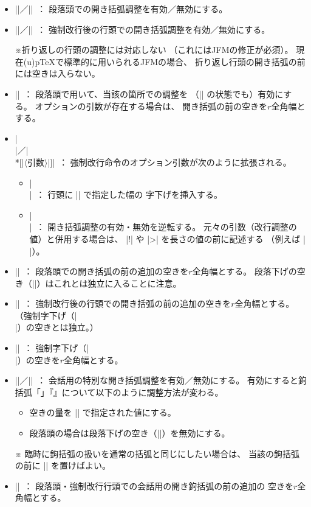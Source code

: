 \documentclass[a4paper]{ltjsarticle}
\newcommand{\Meta}[1]{$\langle$\mbox{}#1\mbox{}$\rangle$}
\newcommand{\Note}{\par\noindent ※}
\newcommand{\Means}{~：\quad}
\providecommand{\pTeX}{p\TeX}
\begin{document}
\begin{itemize}
\item |\useparheadparenindent|／|\nouseparheadparenindent|\Means
  段落頭での開き括弧調整を有効／無効にする。
\item |\uselineheadparenindent|／|\nouselineheadparenindent|\Means
  強制改行後の行頭での開き括弧調整を有効／無効にする。
  \Note 折り返しの行頭の調整には対応しない
  （これにはJFMの修正が必須）。
  現在(u){\pTeX}で標準的に用いられるJFMの場合、
  折り返し行頭の開き括弧の前には空きは入らない。
\item |\prnind[|\Meta{実数$r$}|]|\Means
  段落頭で用いて、当該の箇所での調整を
  （|\nouseparheadparenindent| の状態でも）有効にする。
  オプションの引数が存在する場合は、
  開き括弧の前の空きを$r$全角幅とする。
\item |\\[|\Meta{引数}|]|／|\\*[|\Meta{引数}|]|\Means
  強制改行命令のオプション引数が次のように拡張される。
  \begin{itemize}
  \item |\\[>]|\Means
    行頭に |\lineheadforceindentamount| で指定した幅の
    字下げを挿入する。
  \item |\\[!]|\Means
    開き括弧調整の有効・無効を逆転する。
    元々の引数（改行調整の値）と併用する場合は、
    |!| や |>| を長さの値の前に記述する
    （例えば |\\[>!2mm]|）。
  \end{itemize}
\item |\parheadparenindentamount{|\Meta{実数$r$}|}|\Means
  段落頭での開き括弧の前の追加の空きを$r$全角幅とする。
  段落下げの空き（|\parindent|）はこれとは独立に入ることに注意。
\item |\lineheadparenindentamount{|\Meta{実数$r$}|}|\Means
  強制改行後の行頭での開き括弧の前の追加の空きを$r$全角幅とする。
  （強制字下げ（|\\[>]|）の空きとは独立。）
\item |\lineheadforceindentamount{|\Meta{実数$r$}|}|\Means
  強制字下げ（|\\[>]|）の空きを$r$全角幅とする。
\item |\usedialogueparenindent|／|\nousedialogueparenindent|\Means
  会話用の特別な開き括弧調整を有効／無効にする。
  有効にすると鉤括弧「」『』について以下のように調整方法が変わる。
  \begin{itemize}
  \item 空きの量を |\dialogueparenindentamount| で指定された値にする。
  \item 段落頭の場合は段落下げの空き（|\parindent|）を無効にする。
  \end{itemize}
  \Note
  臨時に鉤括弧の扱いを通常の括弧と同じにしたい場合は、
  当該の鉤括弧の前に |\prnind| を置けばよい。
\item |\dialogueparenindentamount{|\Meta{実数$r$}|}|\Means
  段落頭・強制改行行頭での会話用の開き鉤括弧の前の追加の
  空きを$r$全角幅とする。
\end{itemize}
\end{document}
